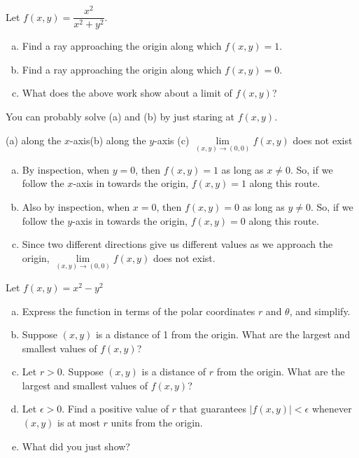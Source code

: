 \begin{question}
Let $f(x,y)=\dfrac{x^2}{x^2+y^2}$.
\begin{enumerate}[(a)]
\item Find a ray approaching the origin along which $f(x,y)=1$.
\item Find a ray approaching the origin along which $f(x,y)=0$.
\item What does the above work show about a limit of $f(x,y)$?
\end{enumerate}
\end{question}
\begin{hint}
You can probably solve (a) and (b) by just staring at $f(x,y)$.
\end{hint}
\begin{answer}
(a) along the $x$-axis\qquad (b) along the $y$-axis \qquad (c) $\lim\limits_{(x,y)\to(0,0)}f(x,y)$ does not exist
\end{answer}
\begin{solution}
\begin{enumerate}[(a)]
\item By inspection, when $y=0$, then $f(x,y)=1$ as long as $x \neq 0$. So, if we follow the $x$-axis in towards the origin, $f(x,y)=1$ along this route.
\item Also by inspection, when $x=0$, then $f(x,y)=0$ as long as $y \neq 0$. So, if we follow the $y$-axis in towards the origin, $f(x,y)=0$ along this route.
\item Since two different directions give us different values as we approach the origin,  $\lim\limits_{(x,y)\to(0,0)}f(x,y)$ does not exist.
\begin{center}
\end{center}
\end{enumerate}

\end{solution}
\begin{question}
Let $f(x,y)=x^2-y^2$
\begin{enumerate}[(a)]
\item Express the function in terms of the polar coordinates $r$ and $\theta$, and simplify.
\item Suppose $(x,y)$ is a distance of 1 from the origin. 
What are the largest and smallest values of $f(x,y)$?
\item Let $r>0$. Suppose $(x,y)$ is a distance of $r$ from the origin. 
What are the largest and smallest values of $f(x,y)$?
\item Let $\epsilon>0$. Find a positive value of $r$ that guarantees $|f(x,y)|<\epsilon$ whenever $(x,y)$ is at most $r$ units from the origin.
\item What did you just show?
\end{enumerate}
\end{question}
